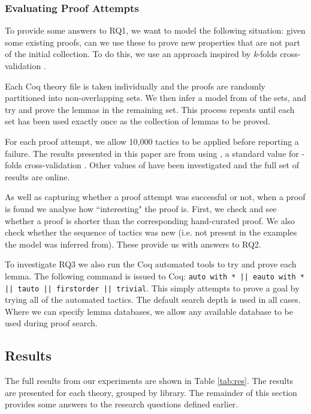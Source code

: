 \documentclass{llncs}
\begin{document}
\vspace{-3mm}

\subsubsection{Evaluating Proof Attempts}
To provide some answers to RQ1, we want to model the following situation: given some existing proofs, can we use these to prove new properties that are not part of the initial collection. To do this, we use an approach inspired by \emph{k}-folds cross-validation \cite{KohaviIJCAI}.

Each Coq theory file is taken individually and the proofs are randomly partitioned into  non-overlapping sets. We then infer a model from  of the sets, and try and prove the lemmas in the remaining set. This process repeats until each set has been used exactly once as the collection of lemmas to be proved.

For each proof attempt, we allow 10,000 tactics to be applied before reporting a failure. The results presented in this paper are from using , a standard value for -folds cross-validation \cite{KohaviIJCAI}. Other values of  have been investigated and the full set of results are online.

As well as capturing whether a proof attempt was successful or not, when a proof is found we analyse how ``interesting" the proof is. First, we check and see whether a proof is shorter than the corresponding hand-curated proof. We also check whether the sequence of tactics was new (i.e. not present in the examples the model was inferred from). These provide us with answers to RQ2.

To investigate RQ3 we also run the Coq automated tools to try and prove each lemma. The following command is issued to Coq: \texttt{auto with * || eauto with * || tauto || firstorder || trivial}. This simply attempts to prove a goal by trying all of the automated tactics. The default search depth is used in all cases. Where we can specify lemma databases, we allow any available database to be used during proof search.

\subsection{Results}
The full results from our experiments are shown in Table \ref{tab:res}. The results are presented for each theory, grouped by library. The remainder of this section provides some answers to the research questions defined earlier.
\end{document}
